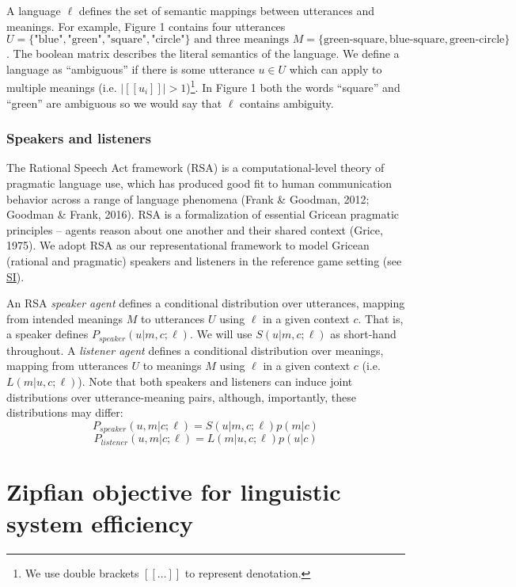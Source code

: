 \documentclass[10pt, letterpaper]{article}
\begin{document}
A language \(\ell\) defines the set of semantic mappings between
utterances and meanings. For example, Figure 1 contains four utterances
\(U = \{\text{"blue"}, \text{"green"}, \text{"square"}, \text{"circle"}\} \text{ and three meanings }M = \{\text{green-square}, \text{blue-square}, \text{green-circle}\}\).
The boolean matrix describes the literal semantics of the language. We
define a language as ``ambiguous'' if there is some utterance
\(u \in U\) which can apply to multiple meanings (i.e.
\(|[[u_i]]| > 1\))\footnote{We use double brackets $[[\dots]]$ to represent denotation.}.
In Figure 1 both the words ``square'' and ``green'' are ambiguous so we
would say that \(\ell\) contains ambiguity.

\subsubsection{Speakers and listeners}\label{speakers-and-listeners}

The Rational Speech Act framework (RSA) is a computational-level theory
of pragmatic language use, which has produced good fit to human
communication behavior across a range of language phenomena (Frank \&
Goodman, 2012; Goodman \& Frank, 2016). RSA is a formalization of
essential Gricean pragmatic principles -- agents reason about one
another and their shared context (Grice, 1975). We adopt RSA as our
representational framework to model Gricean (rational and pragmatic)
speakers and listeners in the reference game setting (see
\href{https://bit.ly/2RBSGcU}{SI}).\par

An RSA \emph{speaker agent} defines a conditional distribution over
utterances, mapping from intended meanings \(M\) to utterances \(U\)
using \(\ell\) in a given context \(c\). That is, a speaker defines
\(P_{speaker}(u|m, c; \ell)\). We will use \(S(u|m, c; \ell)\) as
short-hand throughout. A \emph{listener agent} defines a conditional
distribution over meanings, mapping from utterances \(U\) to meanings
\(M\) using \(\ell\) in a given context \(c\) (i.e. \(L(m|u, c;\ell)\)).
Note that both speakers and listeners can induce joint distributions
over utterance-meaning pairs, although, importantly, these distributions
may differ: \[P_{speaker}(u, m | c; \ell) = S(u|m, c; \ell)p(m|c)\]
\[P_{listener}(u, m| c; \ell) = L(m|u, c; \ell)p(u|c)\]

\section{Zipfian objective for linguistic system
efficiency}\label{zipfian-objective-for-linguistic-system-efficiency}
\end{document}
